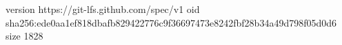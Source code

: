 version https://git-lfs.github.com/spec/v1
oid sha256:ede0aa1ef818dbafb829422776c9f36697473e8242fbf28b34a49d798f05d0d6
size 1828
